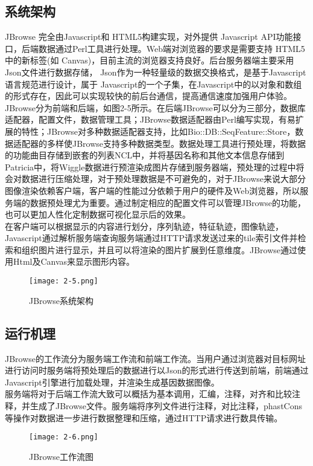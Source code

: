 		\subsection{系统架构}
		JBrowse 完全由Javascript和 HTML5构建实现，对外提供 Javascript API功能接口，后端数据通过Perl工具进行处理。Web端对浏览器的要求是需要支持 HTML5 中的新标签(如 Canvas)，目前主流的浏览器支持良好。后台服务器端主要采用 Json文件进行数据存储，  Json作为一种轻量级的数据交换格式，是基于Javascript语言规范进行设计，属于 Javascript的一个子集，在Javascript中的以对象和数组的形式存在，因此可以实现较快的前后台通信，提高通信速度加强用户体验。\\
		\indent JBrowse分为前端和后端，如图2-5所示。在后端JBrowse可以分为三部分，数据库适配器，配置文件，数据管理工具；JBrowse数据适配器由Perl编写实现，有易扩展的特性；JBrowse对多种数据适配器支持，比如Bio::DB::SeqFeature::Store，数据适配器的多样使JBrowse支持多种数据类型。数据处理工具进行预处理，将数据的功能曲目存储到嵌套的列表NCL中，并将基因名称和其他文本信息存储到Patricia中，将Wiggle数据进行预渲染成图片存储到服务器端，预处理的过程中将会对数据进行压缩处理，对于预处理数据是不可避免的，对于JBrowse来说大部分图像渲染依赖客户端，客户端的性能过分依赖于用户的硬件及Web浏览器，所以服务端的数据预处理尤为重要。通过制定相应的配置文件可以管理JBrowse的功能，也可以更加人性化定制数据可视化显示后的效果。\\
		\indent 在客户端可以根据显示的内容进行划分，序列轨迹，特征轨迹，图像轨迹，Javascript通过解析服务端查询服务端通过HTTP请求发送过来的tile索引文件并检索和组织图片进行显示，并且可以将渲染的图片扩展到任意维度。JBrowse通过使用Html及Canvas来显示图形内容。
		\begin{figure}[!ht]
			\centering
			\texttt{[image: 2-5.png]}
			\caption{JBrowse系统架构}
		\end{figure}
		\subsection{运行机理}
		JBrowse的工作流分为服务端工作流和前端工作流。当用户通过浏览器对目标网址进行访问时服务端将预处理后的数据进行以Json的形式进行传送到前端，前端通过Javascript引擎进行加载处理，并渲染生成基因数据图像。\\
		\indent 服务端将对于后端工作流大致可以概括为基本调用，汇编，注释，对齐和比较注释，并生成了JBrowse文件。服务端将序列文件进行注释，对比注释，phastCons等操作对数据进一步进行数据整理和压缩，通过HTTP请求进行数具传输。
		\begin{figure}[!ht]
			\centering
			\texttt{[image: 2-6.png]}
			\caption{JBrowse工作流图}
		\end{figure}
